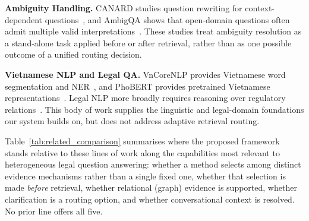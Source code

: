 \documentclass[pdflatex,sn-mathphys-num]{sn-jnl}
\begin{document}
\noindent\textbf{Ambiguity Handling.}
CANARD studies question rewriting for context-dependent
questions~\cite{elgohary2019canard}, and AmbigQA shows that open-domain
questions often admit multiple valid interpretations~\cite{min2020ambigqa}.
These studies treat ambiguity resolution as a stand-alone task applied before
or after retrieval, rather than as one possible outcome of a unified routing
decision.

\noindent\textbf{Vietnamese NLP and Legal QA.}
VnCoreNLP provides Vietnamese word segmentation and
NER~\cite{vu2018vncorenlp}, and PhoBERT provides pretrained Vietnamese
representations~\cite{nguyen2020phobert}. Legal NLP more broadly requires
reasoning over regulatory
relations~\cite{chalkidis2020legalbert,zhong2020nlp_law,guha2023legalbench,louis2024interpretable}.
This body of work supplies the linguistic and legal-domain foundations our
system builds on, but does not address adaptive retrieval routing.

Table~\ref{tab:related_comparison} summarises where the proposed framework
stands relative to these lines of work along the capabilities most relevant to
heterogeneous legal question answering: whether a method selects among
distinct evidence mechanisms rather than a single fixed one, whether that
selection is made \emph{before} retrieval, whether relational (graph) evidence
is supported, whether clarification is a routing option, and whether
conversational context is resolved. No prior line offers all five.
\end{document}
